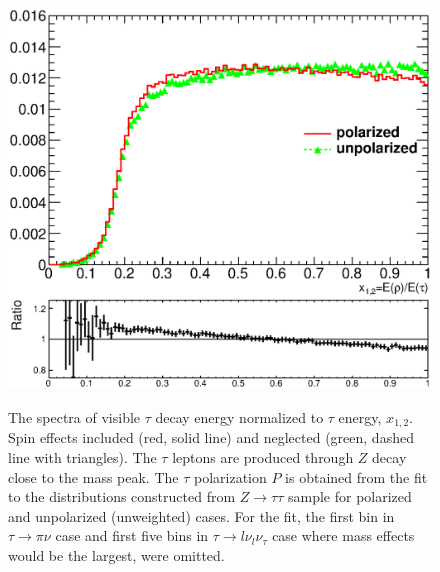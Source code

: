\documentclass{article}
\begin{document}
\begin{figure}[h!]
{\includegraphics[scale=0.43]{h2_800_projectionX_note.eps}
}
 \caption{\label{Fig:spectra} %
 The spectra of visible $\tau$ decay  energy  normalized to $\tau$ energy, $x_{1,2}$. 
Spin effects included (red, solid line) and neglected
(green, dashed line with triangles). The  $\tau$ leptons are produced through 
$Z$ decay close to the mass peak. The $\tau$ polarization $P$ is obtained from the  fit to the distributions constructed from  $Z \to \tau \tau$ sample
for polarized and unpolarized (unweighted) cases. 
For the fit, the first bin in  $\tau \to \pi \nu$ case and first five bins in $\tau \to l \nu_l \nu_\tau $ case
where mass effects would be the largest,  were 
omitted.
  }
\end{figure}
\end{document}
